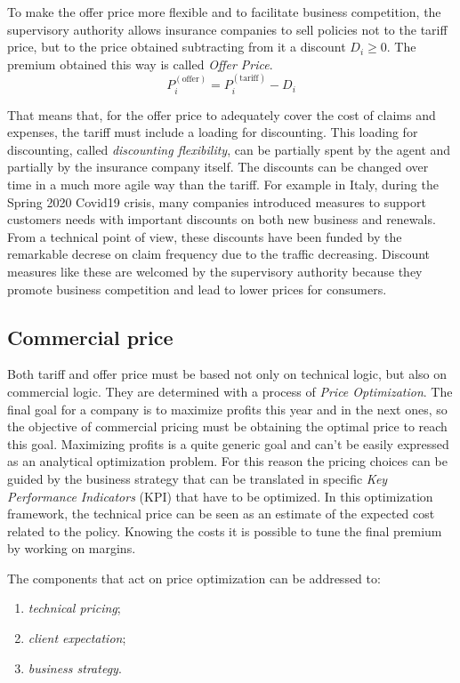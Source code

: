 \documentclass[a4paper, nobind]{templates/ociamthesis}
\providecommand{\tightlist}{%
  \setlength{\itemsep}{0pt}\setlength{\parskip}{0pt}}
\theoremstyle{definition}
\theoremstyle{definition}
\theoremstyle{definition}
\theoremstyle{remark}
\begin{document}
To make the offer price more flexible and to facilitate business competition, the supervisory authority allows insurance companies to sell policies not to the tariff price, but to the price obtained subtracting from it a discount \(D_i\ge0\). The premium obtained this way is called \emph{Offer Price}.
\[
P^{(\text{offer})}_i = P^{(\text{tariff})}_i - D_i
\]

That means that, for the offer price to adequately cover the cost of claims and expenses, the tariff must include a loading for discounting. This loading for discounting, called \emph{discounting flexibility}, can be partially spent by the agent and partially by the insurance company itself. The discounts can be changed over time in a much more agile way than the tariff. For example in Italy, during the Spring 2020 Covid19 crisis, many companies introduced measures to support customers needs with important discounts on both new business and renewals. From a technical point of view, these discounts have been funded by the remarkable decrese on claim frequency due to the traffic decreasing. Discount measures like these are welcomed by the supervisory authority because they promote business competition and lead to lower prices for consumers.

\hypertarget{commercial-price}{%
\subsection{Commercial price}\label{commercial-price}}

Both tariff and offer price must be based not only on technical logic, but also on commercial logic. They are determined with a process of \emph{Price Optimization}. The final goal for a company is to maximize profits this year and in the next ones, so the objective of commercial pricing must be obtaining the optimal price to reach this goal. Maximizing profits is a quite generic goal and can't be easily expressed as an analytical optimization problem. For this reason the pricing choices can be guided by the business strategy that can be translated in specific \emph{Key Performance Indicators} (KPI) that have to be optimized. In this optimization framework, the technical price can be seen as an estimate of the expected cost related to the policy. Knowing the costs it is possible to tune the final premium by working on margins.

The components that act on price optimization can be addressed to:

\begin{enumerate}
\def\labelenumi{\arabic{enumi}.}
\tightlist
\item
  \emph{technical pricing};
\item
  \emph{client expectation};
\item
  \emph{business strategy}.
\end{enumerate}
\end{document}
